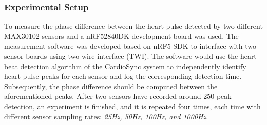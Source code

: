 \subsubsection{Experimental Setup}
To measure the phase difference between the heart pulse detected by two different MAX30102 sensors and a nRF52840DK development board \cite{nRF52840} was used. The measurement software was developed based on nRF5 SDK \cite{2023nRF5} to interface with two sensor boards using two-wire interface (TWI).  The software would use the heart beat detection algorithm of the CardioSync system to independently identify heart pulse peaks for each sensor and log the corresponding detection time. Subsequently, the phase difference should be computed between the aforementioned peaks. After two sensors have recorded around 250 peak detection, an experiment is finished, and it is repeated four times, each time with different sensor sampling rates: \textit{25Hz, 50Hz, 100Hz, and 1000Hz}.

